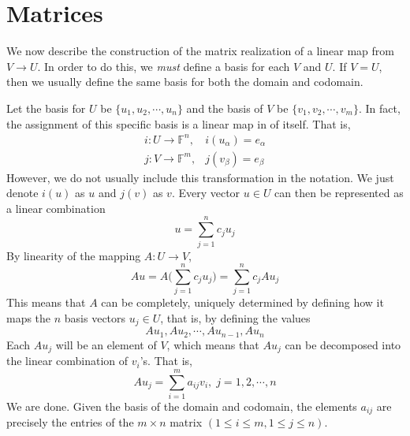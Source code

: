 \section{Matrices}

  We now describe the construction of the matrix realization of a linear map from $V \longrightarrow U$. In order to do this, we \textit{must} define a basis for each $V$ and $U$. If $V = U$, then we usually define the same basis for both the domain and codomain. 

  Let the basis for $U$ be $\{ u_1, u_2, \cdots, u_n\}$ and the basis of $V$ be $\{v_1, v_2, \cdots, v_m\}$. In fact, the assignment of this specific basis is a linear map in of itself. That is, 
  \begin{align*}
    i: U \longrightarrow \mathbb{F}^n, & i(u_\alpha) = e_\alpha  \\
    j: V \longrightarrow \mathbb{F}^m, & j(v_\beta) = e_\beta 
  \end{align*}
  However, we do not usually include this transformation in the notation. We just denote $i(u)$ as $u$ and $j(v)$ as $v$. Every vector $u \in U$ can then be represented as a linear combination
  \begin{equation}
    u = \sum_{j=1}^n c_j u_j
  \end{equation}
  By linearity of the mapping $A: U \longrightarrow V$, 
  \begin{equation}
    A u = A \bigg( \sum_{j=1}^n c_j u_j \bigg) = \sum_{j=1}^n c_j A u_j 
  \end{equation}
  This means that $A$ can be completely, uniquely determined by defining how it maps the $n$ basis vectors $u_j \in U$, that is, by defining the values 
  \begin{equation}
    A u_1, A u_2, \cdots, A u_{n-1}, A u_n
  \end{equation}
  Each $A u_j$ will be an element of $V$, which means that $A u_j$ can be decomposed into the linear combination of $v_i$'s. That is, 
  \begin{equation}
    A u_j = \sum_{i=1}^m a_{i j} v_i, \; j = 1, 2, \cdots, n 
  \end{equation}
  We are done. Given the basis of the domain and codomain, the elements $a_{i j}$ are precisely the entries of the $m \times n$ matrix $(1 \leq i \leq m, 1 \leq j \leq n)$. 
